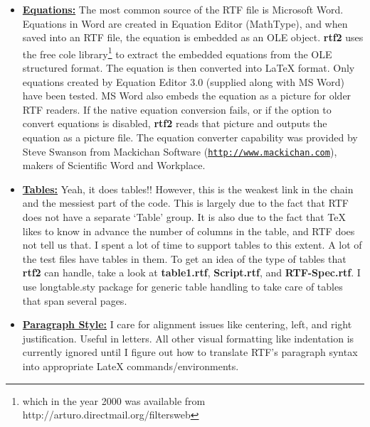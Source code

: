 \documentclass[11pt]{article}
\def\rtf2latex2e{{\bf rtf2\LaTeXe}}
\def\urlone#1{\mbox{\href{#1}{\tt #1}}}
\begin{document}
\begin{itemize}
\item 
{\bf {\underline {Equations:}}} The most common source of the RTF file
is Microsoft Word.  Equations in Word are created in Equation Editor
(MathType), and when saved into an RTF file, the equation is embedded
as an OLE object. \rtf2latex2e uses the free
cole library\footnote{which in the year 2000 was available
from http://arturo.directmail.org/filtersweb} to
extract the embedded equations from the OLE structured format.
The equation is then converted into {\LaTeX} format.
Only equations created by Equation Editor 3.0 (supplied along with MS Word)
have been tested. MS Word also embeds the equation as a picture for
older RTF readers.  If the native equation conversion fails, or if
the option to convert equations is disabled, \rtf2latex2e reads that
picture and outputs the equation as a picture file.
The equation converter capability was provided by Steve Swanson
from Mackichan Software (\urlone{http://www.mackichan.com}),
makers of Scientific Word and Workplace.


\item 
{\bf {\underline {Tables:}}} Yeah, it does tables!!  However, this is
the weakest link in the chain and the messiest part of the code.  This
is largely due to the fact that RTF does not have a separate `Table'
group.  It is also due to the fact that TeX likes to know in advance
the number of columns in the table, and RTF does not tell us that.  I
spent a lot of time to support tables to this extent.  A lot of the
test files have tables in them.  To get an idea of the type of tables
that \rtf2latex2e can handle, take a look at {\bf table1.rtf}, {\bf
Script.rtf}, and {\bf RTF-Spec.rtf}.  I use longtable.sty package for
generic table handling to take care of tables that span several pages.



\item
{\bf {\underline {Paragraph Style:}}} I care for alignment issues like
centering, left, and right justification.  Useful in letters.  All
other visual formatting like indentation is currently ignored until I
figure out how to translate RTF's paragraph syntax into appropriate
LateX commands/environments.



\end{itemize}
\end{document}
